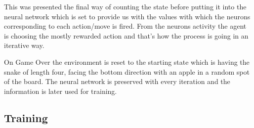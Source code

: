 \documentclass[]{article}
\begin{document}
\newpage

\par This was presented the final way of counting the state before putting it into the neural network which is set to provide us with the values with which the neurons corresponding to each action/move is fired. From the neurons activity the agent is choosing the mostly rewarded action and that's how the process is going in an iterative way. 

\par On Game Over the environment is reset to the starting state which is having the snake of length four, facing the bottom direction with an apple in a random spot of the board. The neural network is preserved with every iteration and the information is later used for training.

\subsection{Training}
 
\end{document}
